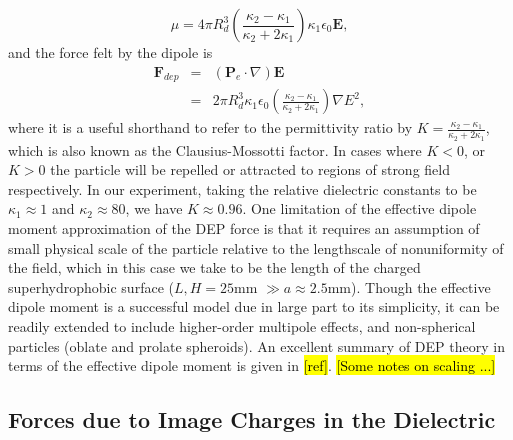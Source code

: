 \documentclass[a4paper, 12pt]{article}
\begin{document}
\begin{equation}\label{dipole_m_2}
\mu = 4 \pi R_d^3 \left( \frac{\kappa_2 - \kappa_1}{\kappa_2 + 2 \kappa_1} \right) \kappa_1 \epsilon_0 \mathbf{E},
\end{equation}
and the force felt by the dipole is 
\begin{eqnarray} \label{dep_force}
\mathbf{F}_{dep} &=& \left( \mathbf{P}_e \cdot \nabla \right) \mathbf{E}\\
&=& 2 \pi R_d^3 \kappa_1 \epsilon_0 \left( \frac{\kappa_2 - \kappa_1}{\kappa_2 + 2 \kappa_1} \right) \nabla E^2,
\end{eqnarray}
where it is a useful shorthand to refer to the permittivity ratio by $K = \frac{\kappa_2 - \kappa_1}{\kappa_2 + 2 \kappa_1}$, which is also known as the Clausius-Mossotti factor. In cases where $K < 0$, or $K>0$ the particle will be repelled or attracted to regions of strong field respectively. In our experiment, taking the relative dielectric constants to be $\kappa_1 \approx 1$ and $\kappa_2 \approx 80$, we have $K \approx 0.96$. One limitation of the effective dipole moment approximation of the DEP force is that it requires an assumption of small physical scale of the particle relative to the lengthscale of nonuniformity of the field, which in this case we take to be the length of the charged superhydrophobic surface ($L,H =25$mm $\gg a \approx 2.5$mm). Though the effective dipole moment is a successful model due in large part to its simplicity, it can be readily extended to include higher-order multipole effects, and non-spherical particles (oblate and prolate spheroids). An excellent summary of DEP theory in terms of the effective dipole moment is given in \hl{[ref]}. \hl{[Some notes on scaling ...]}

\subsection{Forces due to Image Charges in the Dielectric}
\end{document}
